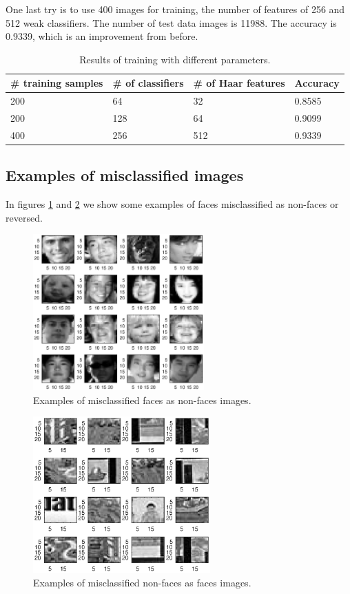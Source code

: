 \documentclass{article}
\begin{document}
One last try is to use 400 images for training, the number of features of 256 and 512 weak classifiers. The number of test data images is 11988. The accuracy is 0.9339, which is an improvement from before.

\begin{table}[]
\centering
\caption{Results of training with different parameters.}
\label{my-label}
\begin{tabular}{|l|l|l|l|}
\hline
\# training samples & \# of classifiers & \# of Haar features & Accuracy \\ \hline
200                 & 64                & 32                  & 0.8585   \\ \hline
200                 & 128               & 64                  & 0.9099   \\ \hline
400                 & 256               & 512                 & 0.9339   \\ \hline
\end{tabular}
\end{table}

\subsection{Examples of misclassified images}

In figures \ref{fig:hard_faces} and \ref{fig:hard_nonfaces} we show some examples of faces misclassified as non-faces or reversed.

\begin{figure}[h]
\centering
\includegraphics[height=6cm]{images/hard_faces}
\caption{Examples of misclassified faces as non-faces images.}
\label{fig:hard_faces}
\end{figure}

\begin{figure}[h]
\centering
\includegraphics[height=6cm]{images/hard_nonfaces}
\caption{Examples of misclassified non-faces as faces images.}
\label{fig:hard_nonfaces}
\end{figure}
\end{document}
